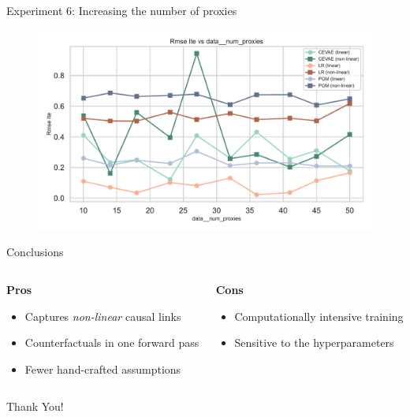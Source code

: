 \documentclass[10pt]{beamer}
\begin{document}
\begin{frame}{Experiment 6: Increasing the number of proxies}
    \begin{figure}[H]
      \includegraphics[width=\textwidth]{images/MyRun_data__num_proxies--rmse_ite.pdf}
    \end{figure}
\end{frame}


\begin{frame}{Conclusions}

\begin{columns}[T]
  \begin{column}{0.48\textwidth}
    \textbf{Pros}
    \begin{itemize}\setlength\itemsep{4pt}
      \item Captures \emph{non-linear} causal links
      \item Counterfactuals in one forward pass
      \item Fewer hand-crafted assumptions
    \end{itemize}
  \end{column}
  \begin{column}{0.48\textwidth}
    \textbf{Cons}
    \begin{itemize}\setlength\itemsep{4pt}
      \item Computationally intensive training
      \item Sensitive to the hyperparameters
    \end{itemize}
  \end{column}
\end{columns}

\end{frame}

{
\begin{frame}[standout]
\thispagestyle{empty}
  {\LARGE Thank You!}
\end{frame}
}
\end{document}
